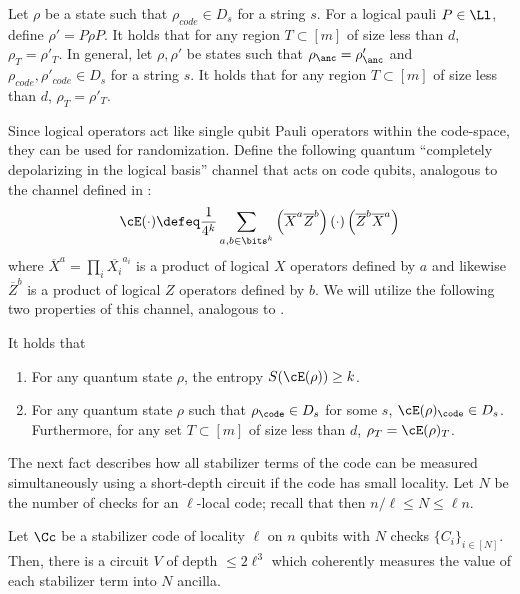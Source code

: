 \documentclass{toc}
\begin{document}
\begin{fact}
\label{fact:samemarginals}
Let $\rho$ be a state such that $\rho_{code}\in D_s$ for a string $s$. For a logical pauli $P\in \Ll$, define $\rho'=P\rho P$. It holds that for any region $T\subset [m]$ of size less than $d$, $\rho_T=\rho'_T$.
In general, let $\rho, \rho'$ be states such that $\rho_{\anc}=\rho'_{\anc}$ and $\rho_{code}, \rho'_{code}\in D_s$ for a string $s$. It holds that for any region $T\subset [m]$ of size less than $d$, $\rho_T=\rho'_T$.
\end{fact}

%

Since logical operators act like single qubit Pauli operators within the code-space, they can be used for randomization. %
Define the following quantum ``completely depolarizing in the logical basis'' channel that acts on code qubits, analogous to the channel defined in :
\begin{align}
\label{eq:randomizer}
\cE(\cdot) \defeq \frac{1}{4^{k}} \sum_{a,b \in \bits^{k}} \left( \overline{X}^a \overline{Z}^b \right)(\cdot)\left( \overline{Z}^b\overline{X}^a  \right)
%
\end{align}
where $\overline{X}^a = \prod_i \overline{X_i}^{a_i}$ is a product of logical $X$ operators defined by $a$ and likewise $\overline{Z}^b$ is a product of logical $Z$ operators defined by $b$.
%
We will utilize the following two properties of this channel, analogous to .
\begin{fact}
\label{fact:Eprop}
It holds that
\begin{enumerate}
    \item For any quantum state $\rho$, the entropy $S(\cE(\rho))\geq k$.
    \item For any quantum state $\rho$ such that $\rho_{\code}\in D_s$ for some $s$, $\cE(\rho)_{\code}\in D_s$. Furthermore, for any set $T\subset [m]$ of size less than $d$, $\rho_T=\cE(\rho)_T$.
\end{enumerate}
\end{fact}

The next fact describes how all stabilizer terms of the code can be measured simultaneously using a short-depth circuit if the code has small locality. Let $N$ be the number of checks for an $\ell$-local code; recall that then $n/\ell \leq N \leq \ell n$.

\begin{fact}
\label{fact:efficient_measurement}
Let $\Cc$ be a stabilizer code of locality $\ell$ on $n$ qubits with $N$ checks $\{C_i\}_{i \in [N]}$. Then, there is a circuit $V$ of depth $\leq 2 \ell^3$ which coherently measures the value of each stabilizer term into $N$ ancilla.
\end{fact}
\end{document}
